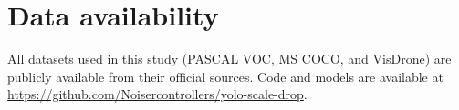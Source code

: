 \documentclass[a4paper,fleqn]{cas-dc}
\begin{document}
\section*{Data availability}
All datasets used in this study (PASCAL VOC, MS COCO, and VisDrone) are publicly available from their official sources. Code and models are available at \url{https://github.com/Noisercontrollers/yolo-scale-drop}.


\printcredits

%





\end{document}
